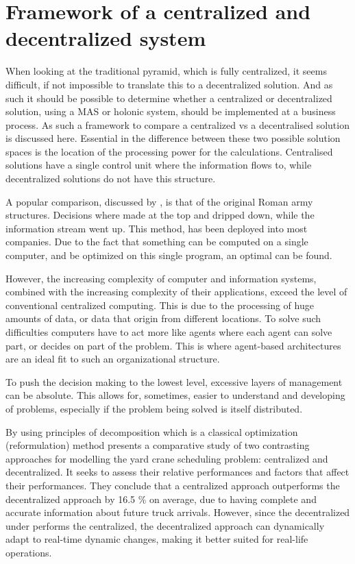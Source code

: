 \section{Framework of a centralized and decentralized system}
When looking at the traditional pyramid, which is fully centralized, it seems difficult, if not impossible to translate this to a decentralized solution. And as such it should be possible to determine whether a centralized or decentralized solution, using a MAS or holonic system, should be implemented at a business process. As such a framework to compare a centralized vs a decentralised solution is discussed here. Essential in the difference between these two possible solution spaces is the location of the processing power for the calculations. Centralised solutions have a single control unit where the information flows to, while decentralized solutions do not have this structure.

A popular comparison, discussed by \citet{parunak1999industrial}, is that of the original Roman army structures. Decisions where made at the top and dripped down, while the information stream went up. This method, has been deployed into most companies. Due to the fact that something can be computed on a single computer, and be optimized on this single program, an optimal can be found.

However, the increasing complexity of computer and information systems, combined with the increasing complexity of their applications, exceed the level of conventional centralized computing. This is due to the processing of huge amounts of data, or data that origin from different locations. To solve such difficulties computers have to act more like agents where each agent can solve part, or decides on part of the problem. This is where agent-based architectures are an ideal fit to such an organizational structure.

To push the decision making to the lowest level, excessive layers of management can be absolute. This allows for, sometimes, easier to understand and developing of problems, especially if the problem being solved is itself distributed.

By using principles of decomposition which is a classical optimization (reformulation) method \citep{sharif2012yard} presents a comparative study of two contrasting approaches for modelling the yard crane scheduling problem: centralized and decentralized. It seeks to assess their relative performances and factors that affect their performances. They conclude that a centralized approach outperforms the decentralized approach by 16.5 \% on average, due to having complete and accurate information about future truck arrivals. However, since the decentralized under performs the centralized, the decentralized approach can dynamically adapt to real-time dynamic changes, making it better suited for real-life operations. 

